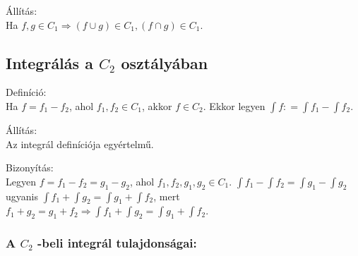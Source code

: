 \documentclass[12pt,a4paper]{scrartcl}
\newenvironment{definicio}{}{}
\newenvironment{bizonyitas}{}{}
\newenvironment{allitas}{}{}
\begin{document}
\begin{allitas}

Állítás:\\
Ha
\(\left. f,g \in C_{1}\Rightarrow\left( {f \cup g} \right) \in C_{1},\left( {f \cap g} \right) \in C_{1} \right.\).

\end{allitas}

\hypertarget{integralas-a-c_2-osztalyaban}{%
\subsection{\texorpdfstring{Integrálás a \(C_{2}\)
osztályában}{Integrálás a C\_\{2\} osztályában}}\label{integralas-a-c_2-osztalyaban}}

\begin{definicio}

Definíció:\\
Ha \(f = f_{1} - f_{2}\), ahol \(f_{1},f_{2} \in C_{1}\), akkor
\(f \in C_{2}\). Ekkor legyen
\({\int f}: = {\int f_{1}} - {\int f_{2}}\).

\end{definicio}

\begin{allitas}

Állítás:\\
Az integrál definíciója egyértelmű.

\end{allitas}

\begin{bizonyitas}

Bizonyítás:\\
Legyen \(f = f_{1} - f_{2} = g_{1} - g_{2}\), ahol
\(f_{1},f_{2},g_{1},g_{2} \in C_{1}\).
\({\int f_{1}} - {\int f_{2}} = {\int g_{1}} - {\int g_{2}}\) ugyanis
\({\int f_{1}} + {\int g_{2}} = {\int g_{1}} + {\int f_{2}}\), mert
\(\left. f_{1} + g_{2} = g_{1} + f_{2}\Rightarrow{\int f_{1}} + {\int g_{2}} = {\int g_{1}} + {\int f_{2}} \right.\).

\end{bizonyitas}

\hypertarget{a-c_2--beli-integral-tulajdonsagai}{%
\subsubsection{\texorpdfstring{A \(C_{2}\) -beli integrál
tulajdonságai:}{A C\_\{2\} -beli integrál tulajdonságai:}}\label{a-c_2--beli-integral-tulajdonsagai}}
\end{document}
